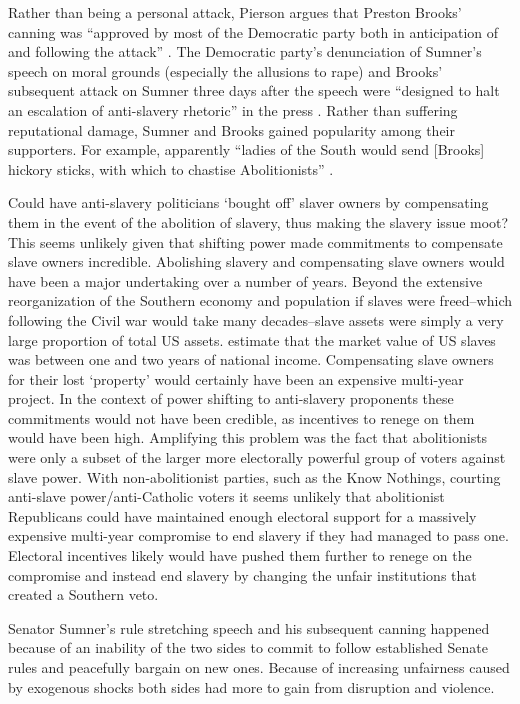 \documentclass[a4paper]{article}\usepackage[]{graphicx}\usepackage[]{color}
\begin{document}
Rather than being a personal attack, Pierson argues that Preston Brooks' canning was ``approved by most of the Democratic party both in anticipation of and following the attack'' \cite[553]{Pierson1995}. The Democratic party's denunciation of Sumner's speech on moral grounds (especially the allusions to rape) and Brooks' subsequent attack on Sumner three days after the speech were ``designed to halt an escalation of anti-slavery rhetoric'' in the press \cite[553]{Pierson1995}. Rather than suffering reputational damage, Sumner and Brooks gained popularity among their supporters. For example, apparently ``ladies of the South would send [Brooks] hickory sticks, with which to chastise Abolitionists'' \cite[255]{Donald2009}. 

Could have anti-slavery politicians `bought off' slaver owners by compensating them in the event of the abolition of slavery, thus making the slavery issue moot? This seems unlikely given that shifting power made commitments to compensate slave owners incredible. Abolishing slavery and compensating slave owners would have been a major undertaking over a number of years. Beyond the extensive reorganization of the Southern economy and population if slaves were freed--which following the Civil war would take many decades--slave assets were simply a very large proportion of total US assets. \cite{Piketty2013} estimate that the market value of US slaves was between one and two years of national income. Compensating slave owners for their lost `property' would certainly have been an expensive multi-year project. In the context of power shifting to anti-slavery proponents these commitments would not have been credible, as incentives to renege on them would have been high. Amplifying this problem was the fact that abolitionists were only a subset of the larger more electorally powerful group of voters against slave power. With non-abolitionist parties, such as the Know Nothings, courting anti-slave power/anti-Catholic voters it seems unlikely that abolitionist Republicans could have maintained enough electoral support for a massively expensive multi-year compromise to end slavery if they had managed to pass one. Electoral incentives likely would have pushed them further to renege on the compromise and instead end slavery by changing the unfair institutions that created a Southern veto.

Senator Sumner's rule stretching speech and his subsequent canning happened because of an inability of the two sides to commit to follow established Senate rules and peacefully bargain on new ones. Because of increasing unfairness caused by exogenous shocks both sides had more to gain from disruption and violence. 
\end{document}
